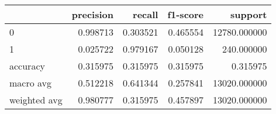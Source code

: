 \begin{tabular}{lrrrr}
\toprule
{} &  precision &    recall &  f1-score &       support \\
\midrule
0            &   0.998713 &  0.303521 &  0.465554 &  12780.000000 \\
1            &   0.025722 &  0.979167 &  0.050128 &    240.000000 \\
accuracy     &   0.315975 &  0.315975 &  0.315975 &      0.315975 \\
macro avg    &   0.512218 &  0.641344 &  0.257841 &  13020.000000 \\
weighted avg &   0.980777 &  0.315975 &  0.457897 &  13020.000000 \\
\bottomrule
\end{tabular}
